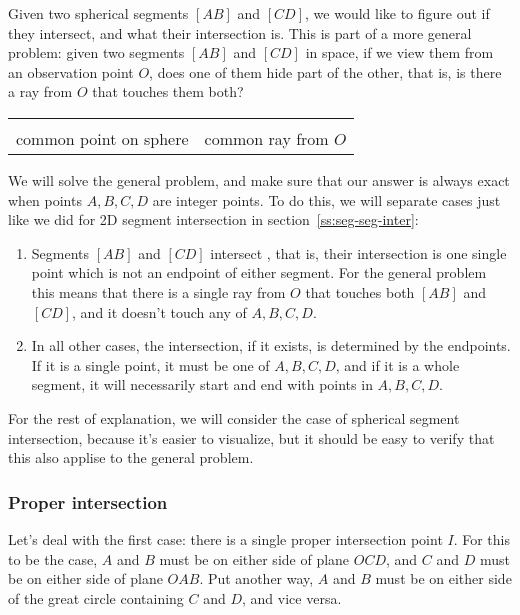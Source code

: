 Given two spherical segments $[AB]$ and $[CD]$, we would like to figure out if they intersect, and what their intersection is. This is part of a more general problem: given two segments $[AB]$ and $[CD]$ in space, if we view them from an observation point $O$, does one of them hide part of the other, that is, is there a ray from $O$ that touches them both?

\begin{center}
    \begin{tabu} to .9\linewidth {X[c]X[c]}
         &  \\
        common point on sphere & common ray from $O$ \\
    \end{tabu}
\end{center}

We will solve the general problem, and make sure that our answer is always exact when points $A,B,C,D$ are integer points. To do this, we will separate cases just like we did for 2D segment intersection in section~\ref{ss:seg-seg-inter}:
\begin{enumerate}
\item Segments $[AB]$ and $[CD]$ intersect , that is, their intersection is one single point which is not an endpoint of either segment. For the general problem this means that there is a single ray from $O$ that touches both $[AB]$ and $[CD]$, and it doesn't touch any of $A,B,C,D$.
\item In all other cases, the intersection, if it exists, is determined by the endpoints. If it is a single point, it must be one of $A,B,C,D$, and if it is a whole segment, it will necessarily start and end with points in $A,B,C,D$.
\end{enumerate}

For the rest of explanation, we will consider the case of spherical segment intersection, because it's easier to visualize, but it should be easy to verify that this also applise to the general problem.

\subsubsection{Proper intersection}
Let's deal with the first case: there is a single proper intersection point $I$. For this to be the case, $A$ and $B$ must be on either side of plane $OCD$, and $C$ and $D$ must be on either side of plane $OAB$. Put another way, $A$ and $B$ must be on either side of the great circle containing $C$ and $D$, and vice versa.

